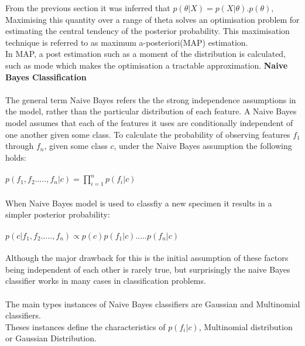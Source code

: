 \documentclass {article}
\begin{document}
From the previous section it was inferred that $p(\theta | X) = p(X | \theta) . p(\theta)$, \\Maximising this quantity over a range of theta solves an optimisation problem for estimating the central tendency of the posterior probability. This maximisation technique is referred to as maximum a-posteriori(MAP) estimation. \\
In MAP, a post estimation such as a moment of the distribution is calculated, such as mode which makes the optimisation a tractable approximation. 
\cleardoublepage
\textbf{Naive Bayes Classification}\\
\\
The general term Naive Bayes refers the the strong independence assumptions in the model, rather than the particular distribution of each feature. A Naive Bayes model assumes that each of the features it uses are conditionally independent of one another given some class. To calculate the probability of observing features $f_1$ through $f_n$, given some class $c$, under the Naive Bayes assumption the following holds: \\
\\
$p(f_1,f_2.....,f_n | c) = \prod_{i=1}^{n} p(f_i | c) $ \\
\\
When Naive Bayes model is used to classfiy a new specimen it results in a simpler posterior probability: \\
\\
$p(c | f_1,f_2.....,f_n) \propto p(c)p(f_1 | c).....p(f_n | c)$ \\
\\
Although the major drawback for this is the initial assumption of these factors being independent of each other is rarely true, but surprisingly the naive Bayes classifier works in many cases in classification problems. \\
\\
The main types instances of Naive Bayes classifiers are Gaussian and Multinomial classifiers. \\ 
Theses instances define the characteristics of $p(f_i | c)$, Multinomial distribution or Gaussian Distribution. \\
\\
\end{document}
